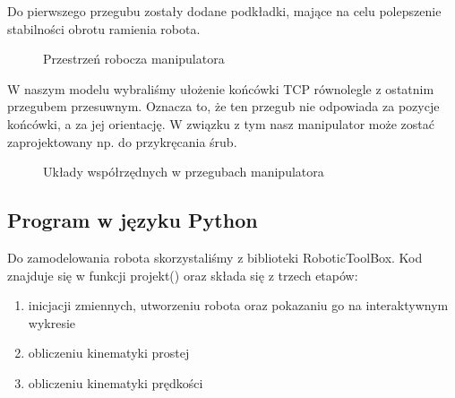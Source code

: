 Do pierwszego przegubu zostały dodane podkładki, mające na celu polepszenie stabilności obrotu ramienia robota.


\begin{figure}[H]
	\centering
	\caption{Przestrzeń robocza manipulatora} 
\end{figure}

 W naszym modelu wybraliśmy ułożenie końcówki TCP równolegle z ostatnim przegubem przesuwnym. Oznacza to, że ten przegub nie odpowiada za pozycje końcówki, a za jej orientację. W związku z tym nasz manipulator może zostać zaprojektowany np. do przykręcania śrub.
 
 \begin{figure}[H]
	\centering
	\caption{Układy współrzędnych w przegubach manipulatora} 
\end{figure}

\subsection{Program w języku Python}

Do zamodelowania robota skorzystaliśmy z biblioteki RoboticToolBox. Kod znajduje się w funkcji projekt() oraz składa się z trzech etapów:
\begin{enumerate}
    \item inicjacji zmiennych, utworzeniu robota oraz pokazaniu go na interaktywnym wykresie
    \item obliczeniu kinematyki prostej
    \item obliczeniu kinematyki prędkości
\end{enumerate}


